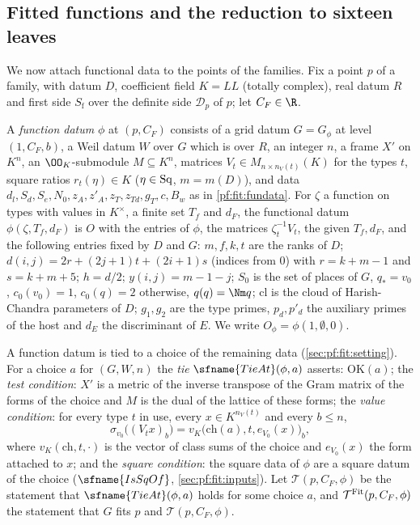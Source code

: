 \subsection{Fitted functions and the reduction to sixteen leaves}\label{sec:pf:fit:assembly}

We now attach functional data to the points of the families. Fix a point $p$ of a family, with datum $D$, coefficient
field $K=\mathit{LL}$ (totally complex), real datum $R$ and first side $S_{\mathrm f}$ over the definite side
$\mathcal D_p$ of $p$; let $C_F\in\R$.

\begin{definition}\label{pf:fit:funin}
A \emph{function datum} $\phi$ at $(p,C_F)$ consists of a grid datum $G=G_\phi$ at level $(1,C_F,b)$, a Weil datum $W$ over
$G$ which is over $R$, an integer $n$, a frame $X'$ on $K^n$, an $\OO_K$-submodule $M\subseteq K^n$, matrices
$V_t\in M_{n\times n_V(t)}(K)$ for the types $t$, square ratios $r_t(\eta)\in K$ ($\eta\in\mathrm{Sq}$, $m=m(D)$), and
data $d_l,S_d,S_e,N_0,z_A,z'_A,z_T,z_{Td},g_T,c,B_w$ as in \cref{pf:fit:fundata}. For $\zeta$ a function on types
with values in $K^\times$, a finite set $T_f$ and $d_F$, the functional datum $\phi(\zeta,T_f,d_F)$ is $O$ with the entries of
$\phi$, the matrices $\zeta_t^{-1}V_t$, the given $T_f,d_F$, and the following entries fixed by $D$ and $G$: $m,f,k,t$ are the
ranks of $D$; $d(i,j)=2r+(2j+1)t+(2i+1)s$ (indices from $0$) with $r=k+m-1$ and $s=k+m+5$; $h=d/2$; $y(i,j)=m-1-j$; $S_0$
is the set of places of $G$, $q_*=v_0$, $c_0(v_0)=1$, $c_0(q)=2$ otherwise, $q(q)=\Nm q$; $\mathrm{cl}$ is the cloud of
Harish-Chandra parameters of $D$; $g_1,g_2$ are the type primes, $p_d,p'_d$ the auxiliary primes of the host and $d_E$
the discriminant of $E$. We write $O_\phi=\phi(1,\emptyset,0)$.
\end{definition}

A function datum is tied to a choice of the remaining data (\cref{sec:pf:fit:setting}). For a choice $a$ for $(G,W,n)$
the \emph{tie} $\sfname{TieAt}(\phi,a)$ asserts: $\mathrm{OK}(a)$; the \emph{test condition}: $X'$ is a metric of the inverse
transpose of the Gram matrix of the forms of the choice and $M$ is the dual of the lattice of these forms; the
\emph{value condition}: for every type $t$ in use, every $x\in K^{n_V(t)}$ and every $b\le n$,
\begin{equation}\label{eq:pf:fit:tieV}
\sigma_{v_0}\bigl((V_tx)_b\bigr)=v_K\bigl(\mathrm{ch}(a),t,e_{V_0}(x)\bigr)_b,
\end{equation}
where $v_K(\mathrm{ch},t,\cdot)$ is the vector of class sums of the choice and $e_{V_0}(x)$ the form attached to $x$; and
the \emph{square condition}: the square data of $\phi$ are a square datum of the choice
($\sfname{IsSqOf}$, \cref{sec:pf:fit:inputs}). Let $\mathcal T(p,C_F,\phi)$ be the statement that $\sfname{TieAt}(\phi,a)$ holds for
some choice $a$, and $\mathcal T^{\mathrm{Fit}}(p,C_F,\phi)$ the statement that $G$ fits $p$ and $\mathcal T(p,C_F,\phi)$.

